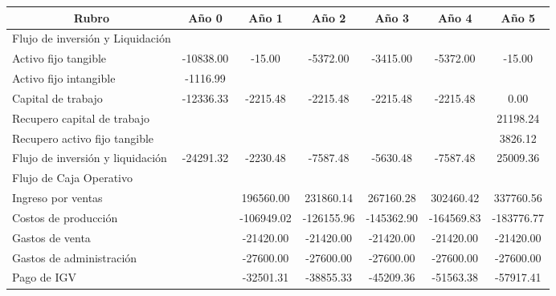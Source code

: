 \documentclass[a4paper,openright,12pt]{book}
\begin{document}
\begin{table}[H]
\centering
\resizebox{16.5cm}{!} {
\begin{tabular}{lcccccc}
\hline
\multicolumn{1}{c}{\textbf{Rubro}} & \textbf{Año 0} & \textbf{Año 1} & \textbf{Año 2} & \textbf{Año 3} & \textbf{Año 4} & \textbf{Año 5} \\ \hline
Flujo de inversión y Liquidación   &                &                &                &                &                &                \\
Activo fijo tangible               & -10838.00      & -15.00         & -5372.00       & -3415.00       & -5372.00       & -15.00         \\
Activo fijo intangible             & -1116.99       &                &                &                &                &                \\
Capital de trabajo                 & -12336.33      & -2215.48       & -2215.48       & -2215.48       & -2215.48       & 0.00           \\
Recupero capital de trabajo        &                &                &                &                &                & 21198.24       \\
Recupero activo fijo tangible      &                &                &                &                &                & 3826.12        \\
Flujo de inversión y liquidación   & -24291.32      & -2230.48       & -7587.48       & -5630.48       & -7587.48       & 25009.36       \\
Flujo de Caja Operativo            &                &                &                &                &                &                \\
Ingreso por ventas                 &                & 196560.00      & 231860.14      & 267160.28      & 302460.42      & 337760.56      \\
Costos de producción               &                & -106949.02     & -126155.96     & -145362.90     & -164569.83     & -183776.77     \\
Gastos de venta                    &                & -21420.00      & -21420.00      & -21420.00      & -21420.00      & -21420.00      \\
Gastos de administración           &                & -27600.00      & -27600.00      & -27600.00      & -27600.00      & -27600.00      \\
Pago de IGV                        &                & -32501.31      & -38855.33      & -45209.36      & -51563.38      & -57917.41      \\

\end{tabular}}
\end{table}
\end{document}
